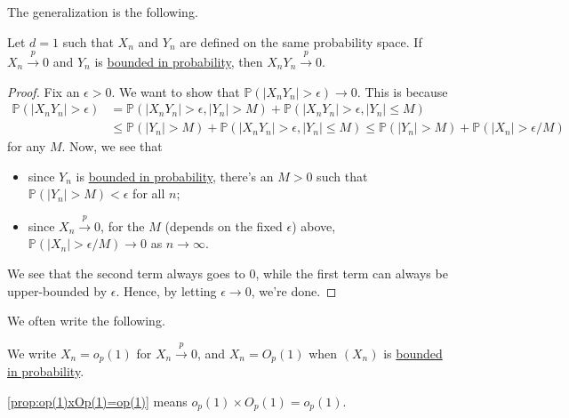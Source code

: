 The generalization is the following.

\begin{proposition}\label{prop:op(1)xOp(1)=op(1)}
	Let \(d = 1\) such that \(X_n\) and \(Y_n\) are defined on the same probability space. If \(X_n \overset{p}{\to } 0\) and \(Y_n\) is \hyperref[def:bounded-in-probability]{bounded in probability}, then \(X_n Y_n \overset{p}{\to } 0\).
\end{proposition}
\begin{proof}
	Fix an \(\epsilon > 0\). We want to show that \(\mathbb{P} (\vert X_n Y_n \vert > \epsilon ) \to 0\). This is because
	\[
		\begin{split}
			\mathbb{P} (\vert X_n Y_n \vert > \epsilon )
			 & = \mathbb{P} (\vert X_n Y_n \vert > \epsilon , \vert Y_n \vert > M) + \mathbb{P} (\vert X_n Y_n \vert > \epsilon , \vert Y_n \vert \leq M) \\
			 & \leq \mathbb{P} (\vert Y_n \vert > M) + \mathbb{P} (\vert X_n Y_n \vert > \epsilon , \vert Y_n \vert \leq M)
			\leq \mathbb{P} (\vert Y_n \vert > M ) + \mathbb{P} (\vert X_n \vert > \epsilon / M)
		\end{split}
	\]
	for any \(M\). Now, we see that
	\begin{itemize}
		\item since \(Y_n\) is \hyperref[def:bounded-in-probability]{bounded in probability}, there's an \(M > 0\) such that \(\mathbb{P} (\vert Y_n \vert > M) < \epsilon \) for all \(n\);
		\item since \(X_n \overset{p}{\to } 0\), for the \(M\) (depends on the fixed \(\epsilon \)) above, \(\mathbb{P} (\vert X_n \vert > \epsilon / M) \to 0\) as \(n \to \infty \).
	\end{itemize}
	We see that the second term always goes to \(0\), while the first term can always be upper-bounded by \(\epsilon \). Hence, by letting \(\epsilon \to 0\), we're done.
\end{proof}

We often write the following.

\begin{notation}
	We write \(X_n = o_p(1)\) for \(X_n \overset{p}{\to } 0\), and \(X_n = O_p(1)\) when \((X_n)\) is \hyperref[def:bounded-in-probability]{bounded in probability}.
\end{notation}

\begin{remark}
	\autoref{prop:op(1)xOp(1)=op(1)} means \(o_p(1) \times O_p(1) = o_p(1)\).
\end{remark}

